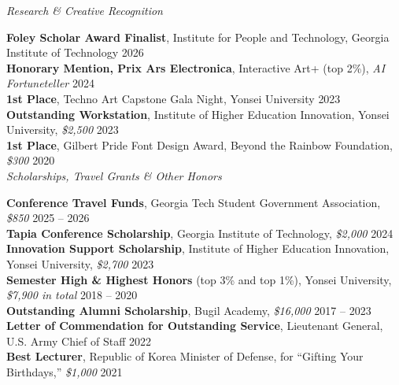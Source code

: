 \noindent \textit{Research \& Creative Recognition}\par\nopagebreak
\noindent \textbf{Foley Scholar Award Finalist}, Institute for People and Technology, Georgia Institute of Technology \hfill{2026}\\
\textbf{Honorary Mention, Prix Ars Electronica}, Interactive Art+ (top 2\%), \textit{AI Fortuneteller} \hfill{2024}\\
\textbf{1st Place}, Techno Art Capstone Gala Night, Yonsei University \hfill{2023}\\
\textbf{Outstanding Workstation}, Institute of Higher Education Innovation, Yonsei University, \textit{\$2,500} \hfill{2023}\\
\textbf{1st Place}, Gilbert Pride Font Design Award, Beyond the Rainbow Foundation, \textit{\$300} \hfill{2020}\\

\noindent \textit{Scholarships, Travel Grants \& Other Honors}\par\nopagebreak
\noindent \textbf{Conference Travel Funds}, Georgia Tech Student Government Association, \textit{\$850} \hfill{2025 -- 2026}\\
\textbf{Tapia Conference Scholarship}, Georgia Institute of Technology, \textit{\$2,000} \hfill{2024}\\
\textbf{Innovation Support Scholarship}, Institute of Higher Education Innovation, Yonsei University, \textit{\$2,700} \hfill{2023}\\
\textbf{Semester High \& Highest Honors} (top 3\% and top 1\%), Yonsei University, \textit{\$7,900 in total} \hfill{2018 -- 2020}\\
\textbf{Outstanding Alumni Scholarship}, Bugil Academy, \textit{\$16,000} \hfill{2017 -- 2023}\\
\textbf{Letter of Commendation for Outstanding Service}, Lieutenant General, U.S. Army Chief of Staff \hfill{2022}\\
\textbf{Best Lecturer}, Republic of Korea Minister of Defense, for ``Gifting Your Birthdays,'' \textit{\$1,000} \hfill{2021}\\
